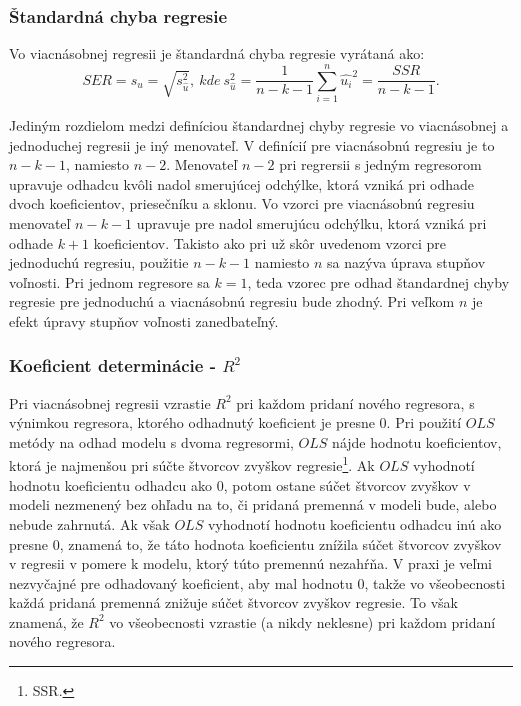 \documentclass[]{tukediphc}
\begin{document}
\subsubsection{Štandardná chyba regresie}

Vo viacnásobnej regresii je štandardná chyba regresie vyrátaná ako:
\begin{equation}
    SER = s_{\hat{u}} = \sqrt{s_{\hat{u}}^2},  \ kde \  s_{\hat{u}}^2 =\frac{1}{n-k-1}\sum_{i=1}^{n}\hat{u_{i}}^2 = \frac{SSR}{n-k-1}.
\end{equation}

Jediným rozdielom medzi definíciou štandardnej chyby regresie vo viacnásobnej a jednoduchej regresii je iný menovateľ. V definícií pre viacnásobnú regresiu je to $n - k - 1$, namiesto $n - 2$. Menovateľ $n - 2$ pri regrersii s jedným regresorom upravuje odhadcu kvôli nadol smerujúcej odchýlke, ktorá vzniká pri odhade dvoch koeficientov, priesečníku a sklonu. Vo vzorci pre viacnásobnú regresiu menovateľ $n - k - 1$ upravuje pre nadol smerujúcu odchýlku, ktorá vzniká pri odhade $k + 1$ koeficientov. Takisto ako pri už skôr uvedenom vzorci pre jednoduchú regresiu, použitie $n - k - 1$ namiesto $n$ sa nazýva úprava stupňov voľnosti. Pri jednom regresore sa $k = 1$, teda vzorec pre odhad štandardnej chyby regresie pre jednoduchú a viacnásobnú regresiu bude zhodný. Pri veľkom $n$ je efekt úpravy stupňov voľnosti zanedbateľný.   

\subsubsection{Koeficient determinácie - $R^2$}

Pri viacnásobnej regresii vzrastie $R^2$ pri každom pridaní nového regresora, s výnimkou regresora, ktorého odhadnutý koeficient je presne 0. Pri použití $OLS$ metódy na odhad modelu s dvoma regresormi, $OLS$ nájde hodnotu koeficientov, ktorá je najmenšou pri súčte štvorcov zvyškov regresie\footnote{SSR.}. Ak $OLS$ vyhodnotí hodnotu koeficientu odhadcu ako 0, potom ostane súčet štvorcov zvyškov v modeli nezmenený bez ohľadu na to, či pridaná premenná v modeli bude, alebo nebude zahrnutá. Ak však $OLS$ vyhodnotí hodnotu koeficientu odhadcu inú ako presne 0, znamená to, že táto hodnota koeficientu znížila súčet štvorcov zvyškov v regresii v pomere k modelu, ktorý túto premennú nezahŕňa. V praxi je veľmi nezvyčajné pre odhadovaný koeficient, aby mal hodnotu 0, takže vo všeobecnosti každá pridaná premenná znižuje súčet štvorcov zvyškov regresie. To však znamená, že $R^2$ vo všeobecnosti vzrastie (a nikdy neklesne) pri každom pridaní nového regresora. 
\end{document}
